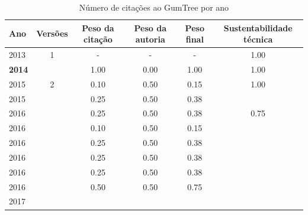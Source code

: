 \begin{table}[H]
\caption{Número de citações ao GumTree por ano}
\centering
\begin{tabular}{| l | c | c | c | c | c |}
  \hline
  Ano & Versões & Peso da citação & Peso da autoria & Peso final & Sustentabilidade técnica \\
  \hline
        2013 & 1 & - & - & -
        &
          {\color{blue} 1.00}
        \\
\hline
            {\bf 2014}
          &
          
          &
          1.00
          &
          0.00
          &
          1.00
          &
            {\color{blue} 1.00}
          \\
\hline
            2015
          &
          2
          &
          0.10
          &
          0.50
          &
          0.15
          &
            {\color{blue} 1.00}
          \\
            2015
          &
          
          &
          0.25
          &
          0.50
          &
          0.38
          &
          \\
\hline
            2016
          &
          
          &
          0.25
          &
          0.50
          &
          0.38
          &
            {\color{blue} 0.75}
          \\
            2016
          &
          
          &
          0.10
          &
          0.50
          &
          0.15
          &
          \\
            2016
          &
          
          &
          0.25
          &
          0.50
          &
          0.38
          &
          \\
            2016
          &
          
          &
          0.25
          &
          0.50
          &
          0.38
          &
          \\
            2016
          &
          
          &
          0.25
          &
          0.50
          &
          0.38
          &
          \\
            2016
          &
          
          &
          0.50
          &
          0.50
          &
          0.75
          &
          \\
\hline
            2017
          &
          

\end{tabular}
\end{table}
